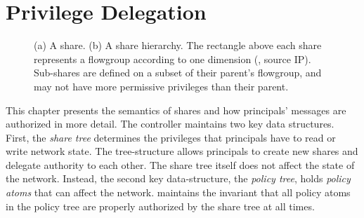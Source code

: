 \begin{landscape}

\end{landscape}

\chapter{Privilege Delegation}
\label{sec:delegation}

\begin{figure}[t]
\centering
{}\hfill
{}
\caption{(a) A \sys share. (b) A share
hierarchy. The rectangle above each share represents a flowgroup
according to one dimension (\eg, source IP). Sub-shares are defined
on a subset of their parent's flowgroup, and may not have more permissive
privileges than their parent.}
\label{fig:shares}
\end{figure}


This chapter presents the semantics of shares and how principals'
messages are authorized in more detail. The \sys
controller maintains two key data structures. First, the \emph{share
  tree} determines the privileges that principals have to read or write
  network state. The tree-structure allows principals to create new shares and
delegate authority to each other. The share tree itself does not
affect the state of the network. Instead, the second key
data-structure, the \emph{policy tree}, holds \emph{policy atoms} that
can affect the network. \sys maintains the invariant that all policy
atoms in the policy tree are properly authorized by the share tree at
all times.

